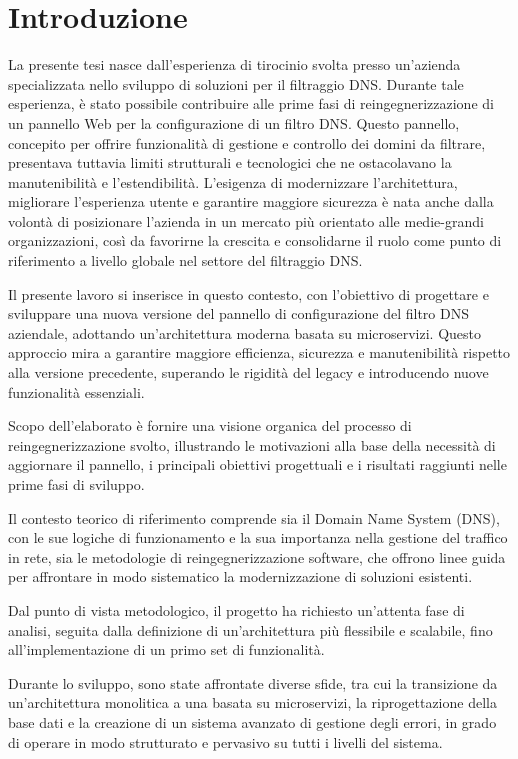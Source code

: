 \chapter{Introduzione}

La presente tesi nasce dall’esperienza di tirocinio svolta presso un’azienda specializzata nello sviluppo di soluzioni per il filtraggio DNS. Durante tale esperienza, è stato possibile contribuire alle prime fasi di reingegnerizzazione di un pannello Web per la configurazione di un filtro DNS. Questo pannello, concepito per offrire funzionalità di gestione e controllo dei domini da filtrare, presentava tuttavia limiti strutturali e tecnologici che ne ostacolavano la manutenibilità e l’estendibilità. L’esigenza di modernizzare l’architettura, migliorare l’esperienza utente e garantire maggiore sicurezza è nata anche dalla volontà di posizionare l’azienda in un mercato più orientato alle medie-grandi organizzazioni, così da favorirne la crescita e consolidarne il ruolo come punto di riferimento a livello globale nel settore del filtraggio DNS.

Il presente lavoro si inserisce in questo contesto, con l’obiettivo di progettare e sviluppare una nuova versione del pannello di configurazione del filtro DNS aziendale, adottando un’architettura moderna basata su microservizi. Questo approccio mira a garantire maggiore efficienza, sicurezza e manutenibilità rispetto alla versione precedente, superando le rigidità del legacy e introducendo nuove funzionalità essenziali.

Scopo dell’elaborato è fornire una visione organica del processo di reingegnerizzazione svolto, illustrando le motivazioni alla base della necessità di aggiornare il pannello, i principali obiettivi progettuali e i risultati raggiunti nelle prime fasi di sviluppo.

Il contesto teorico di riferimento comprende sia il Domain Name System (DNS), con le sue logiche di funzionamento e la sua importanza nella gestione del traffico in rete, sia le metodologie di reingegnerizzazione software, che offrono linee guida per affrontare in modo sistematico la modernizzazione di soluzioni esistenti.

Dal punto di vista metodologico, il progetto ha richiesto un'attenta fase di analisi, seguita dalla definizione di un’architettura più flessibile e scalabile, fino all’implementazione di un primo set di funzionalità.

Durante lo sviluppo, sono state affrontate diverse sfide, tra cui la transizione da un’architettura monolitica a una basata su microservizi, la riprogettazione della base dati e la creazione di un sistema avanzato di gestione degli errori, in grado di operare in modo strutturato e pervasivo su tutti i livelli del sistema.

